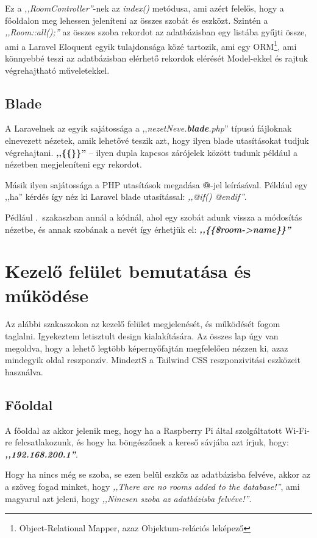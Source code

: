 \documentclass[
]{thesis-ekf}
\theoremstyle{definition}
\theoremstyle{remark}
\begin{document}
	Ez a \emph{,,RoomController''}-nek az \emph{index()} metódusa, ami azért felelős, hogy a főoldalon meg lehessen jeleníteni az összes szobát és eszközt. Szintén a \emph{,,Room::all();''} az összes szoba rekordot az adatbázisban egy listába gyűjti össze, ami a Laravel Eloquent\cite{laravel-eloquent} egyik tulajdonsága közé tartozik, ami egy ORM\footnote{Object-Relational Mapper, azaz Objektum-relációs leképező}, ami könnyebbé teszi az adatbázisban elérhető rekordok elérését Model-ekkel és rajtuk végrehajtható műveletekkel.
	\subsection{Blade}
	A Laravelnek az egyik sajátossága a ,,\emph{nezetNeve.\textbf{blade}.php}'' típusú fájloknak elnevezett nézetek, amik lehetővé  teszik azt, hogy ilyen blade utasításokat tudjuk végrehajtani. \textbf{,,\{\{\}\}''} -- ilyen dupla kapcsos zárójelek között tudunk például a nézetben megjeleníteni egy rekordot.
	
	Másik ilyen sajátossága a PHP utasítások megadása \textbf{@}-jel leírásával. Például egy ,,ha'' kérdés így néz ki Laravel blade utasítással: \emph{,,@if() @endif''}. 
	
	Pédlául .~szakaszban annál a kódnál, ahol egy szobát adunk vissza a módosítás nézetbe, és annak szobának a nevét így érhetjük el: \emph{\textbf{,,\{\{\$room->name\}\}''}}
	
	\section{Kezelő felület bemutatása és működése}
	Az alábbi szakaszokon az kezelő felület megjelenését, és működését fogom taglalni. Igyekeztem letisztult design kialakítására. Az összes lap úgy van megoldva, hogy a lehető legtöbb képernyőfajtán megfelelően nézzen ki, azaz mindegyik oldal reszponzív. MindeztS a Tailwind CSS reszponzivitási eszközeit használva.\cite{tailwind-responsive}
	\subsection{Főoldal}
	A főoldal az akkor jelenik meg, hogy ha a Raspberry Pi által szolgáltatott Wi-Fi-re felcsatlakozunk, és hogy ha böngészőnek a kereső sávjába azt írjuk, hogy:\\
	\textbf{\emph{,,192.168.200.1''}}.
	
	Hogy ha nincs még se szoba, se ezen belül eszköz az adatbázisba felvéve, akkor az a szöveg fogad minket, hogy \emph{,,There are no rooms added to the database!''}, ami magyarul azt jeleni, hogy \emph{,,Nincsen szoba az adatbázisba felvéve!''}.
	
\end{document}
